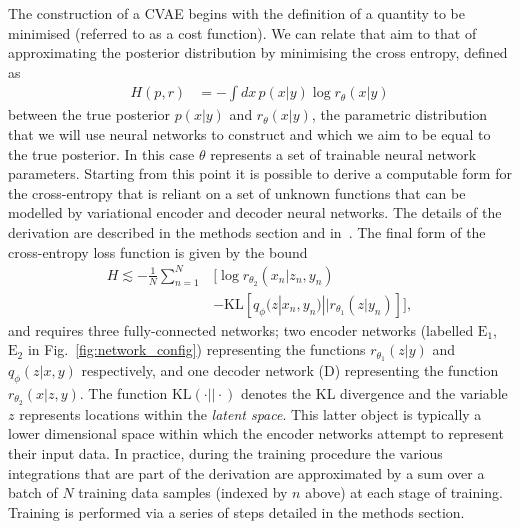 \documentclass[%
showpacs,
 amsmath,amssymb,
 aps,
 twocolumn,
 prl,
 reprint,
floatfix,
]{revtex4-1}
\begin{document}
%
%
The construction of a \ac{CVAE} begins with the definition of a quantity to be
minimised (referred to as a cost function). We can relate that aim to
that of approximating the posterior distribution by minimising the cross
entropy, defined as
%
\begin{align}\label{eq:cross_ent} 
H(p,r) &= -\int dx\, p(x|y) \log r_{\theta}(x|y) 
\end{align}
%
between the true posterior $p(x|y)$ and $r_{\theta}(x|y)$, the parametric
distribution that we will use neural networks to construct and which we aim to
be equal to the true posterior. In this case $\theta$ represents a set of
trainable neural network parameters. Starting from this point it is possible to
derive a computable form for the cross-entropy that is reliant on a set of
unknown functions that can be modelled by variational encoder
and decoder neural networks. The details of the derivation are described in
the methods section and in~\cite{1904.06264}. The final form of the
cross-entropy loss function is given by the bound
%
\begin{align}\label{eq:cost3}
H \lesssim -\frac{1}{N}\sum_{n=1}^{N}&\Big[\log
r_{\theta_{2}}(x_{n}|z_{n},y_{n})\nonumber\\
&-\text{KL}\left[q_{\phi}(z|x_{n},y_{n})||r_{\theta_{1}}(z|y_{n})\right]\Big],
\end{align}
%
and requires three fully-connected networks; two encoder networks (labelled
$\textrm{E}_1$, $\textrm{E}_2$ in Fig.~\ref{fig:network_config}) representing
the functions $r_{\theta_{1}}(z|y)$ and $q_{\phi}(z|x,y)$ respectively, and one
decoder network (D) representing the function $r_{\theta_{2}}(x|z,y)$. The
function $\text{KL}(\cdot||\cdot)$ denotes the \ac{KL} divergence and
the variable $z$ represents locations within the \emph{latent space}.  This
latter object is typically a lower dimensional space within which the encoder
networks attempt to represent their input data. In practice, during the
training procedure the various integrations that are part of the derivation are
approximated by a sum over a batch of $N$ training data samples (indexed by $n$
above) at each stage of training. Training is performed via a series of steps
detailed in the methods section.
\end{document}
